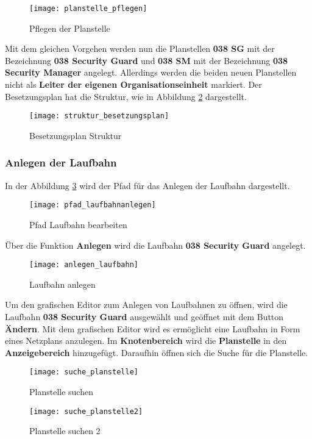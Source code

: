 \begin{figure}[H]
	\centering
	\texttt{[image: planstelle\_pflegen]}
	\caption{Pflegen der Planstelle}
	\label{fig:planstelle_pflegen}
\end{figure}

Mit dem gleichen Vorgehen werden nun die Planstellen \textbf{038 SG} mit der Bezeichnung \textbf{038 Security Guard} und \textbf{038 SM} mit der Bezeichnung \textbf{038 Security Manager} angelegt. Allerdings werden die beiden neuen Planstellen nicht als \textbf{Leiter der eigenen Organisationseinheit} markiert. Der Besetzungsplan hat die Struktur, wie in Abbildung \ref{fig:struktur_besetzungsplan} dargestellt.

\begin{figure}[H]
	\centering
	\texttt{[image: struktur\_besetzungsplan]}
	\caption{Besetzungsplan Struktur}
	\label{fig:struktur_besetzungsplan}
\end{figure}

\subsubsection{Anlegen der Laufbahn}
In der Abbildung \ref{fig:pfad_laufbahnanlegen} wird der Pfad für das Anlegen der Laufbahn dargestellt.

\begin{figure}[H]
	\centering
	\texttt{[image: pfad\_laufbahnanlegen]}
	\caption{Pfad Laufbahn bearbeiten}
	\label{fig:pfad_laufbahnanlegen}
\end{figure}

Über die Funktion \textbf{Anlegen} wird die Laufbahn \textbf{038 Security Guard} angelegt.

\begin{figure}[H]
	\centering
	\texttt{[image: anlegen\_laufbahn]}
	\caption{Laufbahn anlegen}
	\label{fig:anlegen_laufbahn}
\end{figure}

Um den grafischen Editor zum Anlegen von Laufbahnen zu öffnen, wird die Laufbahn \textbf{038 Security Guard} ausgewählt und geöffnet mit dem Button \textbf{Ändern}. Mit dem grafischen Editor wird es ermöglicht eine Laufbahn in Form eines Netzplans anzulegen. Im \textbf{Knotenbereich} wird die \textbf{Planstelle} in den \textbf{Anzeigebereich} hinzugefügt. Daraufhin öffnen sich die Suche für die Planstelle.

\begin{figure}[H]
	\centering
	\texttt{[image: suche\_planstelle]}
	\caption{Planstelle suchen}
	\label{fig:suche_planstelle}
\end{figure}
\begin{figure}[H]
	\centering
	\texttt{[image: suche\_planstelle2]}
	\caption{Planstelle suchen 2}
	\label{fig:suche_planstelle2}
\end{figure}

